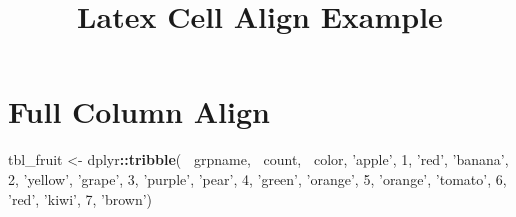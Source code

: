 \documentclass[]{article}
\title{Latex Cell Align Example}
\author{}
\date{\vspace{-2.5em}}
\newenvironment{Shaded}{\begin{snugshade}}{\end{snugshade}}
\newcommand{\DecValTok}[1]{\textcolor[rgb]{0.00,0.00,0.81}{#1}}
\newcommand{\KeywordTok}[1]{\textcolor[rgb]{0.13,0.29,0.53}{\textbf{#1}}}
\newcommand{\NormalTok}[1]{#1}
\newcommand{\OperatorTok}[1]{\textcolor[rgb]{0.81,0.36,0.00}{\textbf{#1}}}
\newcommand{\StringTok}[1]{\textcolor[rgb]{0.31,0.60,0.02}{#1}}
\begin{document}
\maketitle

\hypertarget{full-column-align}{%
\section{Full Column Align}\label{full-column-align}}

\begin{Shaded}
\begin{Highlighting}[]
\NormalTok{tbl_fruit <-}\StringTok{ }\NormalTok{dplyr}\OperatorTok{::}\KeywordTok{tribble}\NormalTok{( }\OperatorTok{~}\NormalTok{grpname, }\OperatorTok{~}\NormalTok{count, }\OperatorTok{~}\NormalTok{color,}
                             \StringTok{'apple'}\NormalTok{, }\DecValTok{1}\NormalTok{, }\StringTok{'red'}\NormalTok{,}
                             \StringTok{'banana'}\NormalTok{, }\DecValTok{2}\NormalTok{, }\StringTok{'yellow'}\NormalTok{,}
                             \StringTok{'grape'}\NormalTok{, }\DecValTok{3}\NormalTok{, }\StringTok{'purple'}\NormalTok{,}
                             \StringTok{'pear'}\NormalTok{, }\DecValTok{4}\NormalTok{, }\StringTok{'green'}\NormalTok{,}
                             \StringTok{'orange'}\NormalTok{, }\DecValTok{5}\NormalTok{, }\StringTok{'orange'}\NormalTok{,}
                             \StringTok{'tomato'}\NormalTok{, }\DecValTok{6}\NormalTok{, }\StringTok{'red'}\NormalTok{,}
                             \StringTok{'kiwi'}\NormalTok{, }\DecValTok{7}\NormalTok{, }\StringTok{'brown'}\NormalTok{)}



\end{Highlighting}
\end{Shaded}
\end{document}

